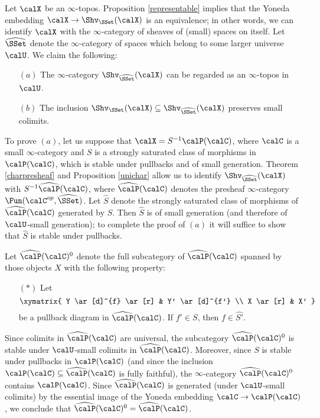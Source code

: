 \begin{remark}\label{quest}
Let $\calX$ be an $\infty$-topos. Proposition \ref{representable} implies that the Yoneda
embedding $\calX \rightarrow \Shv_{\SSet}(\calX)$ is an equivalence; in other words, we can identify $\calX$ with the $\infty$-category of sheaves of (small) spaces on itself. Let $\widehat{\SSet}$ denote the $\infty$-category of spaces which belong to some larger universe $\calU$. We claim the following:
\begin{itemize}
\item[$(a)$] The $\infty$-category $\Shv_{ \widehat{\SSet} }( \calX)$ can be regarded
as an $\infty$-topos in $\calU$.
\item[$(b)$] The inclusion $\Shv_{\SSet}(\calX) \subseteq \Shv_{\widehat{\SSet}}(\calX)$ preserves small colimits.
\end{itemize}
To prove $(a)$, let us suppose that $\calX = S^{-1} \calP(\calC)$, where
$\calC$ is a small $\infty$-category and $S$ is a strongly saturated class of morphisms
in $\calP(\calC)$, which is stable under pullbacks and of small generation.
Theorem \ref{charpresheaf} and Proposition \ref{unichar} allow us to identify
$\Shv_{\widehat{\SSet}}(\calX)$ with $S^{-1} \widehat{\calP}(\calC)$, where
$\widehat{\calP}(\calC)$ denotes the presheaf $\infty$-category
$\Fun( \calC^{op}, \widehat{\SSet})$. Let $\widehat{S}$ denote the strongly saturated class of morphisms of $\widehat{\calP}(\calC)$ generated by $S$. Then $\widehat{S}$ is of small generation (and therefore of $\calU$-small generation); to complete the proof of $(a)$ it will suffice to show that $\widehat{S}$ is stable under pullbacks. 

Let $\widehat{\calP}(\calC)^{0}$ denote the full subcategory of $\widehat{\calP}(\calC)$ spanned by those objects $X$ with the following property: 
\begin{itemize}
\item[$(\ast)$] Let
$$ \xymatrix{ Y \ar[d]^{f} \ar[r] & Y' \ar[d]^{f'} \\
X \ar[r] & X' }$$
be a pullback diagram in $\widehat{\calP}(\calC)$. If $f' \in S$, then $f \in \widehat{S'}$.
\end{itemize}
Since colimits in $\widehat{\calP}(\calC)$ are universal, the subcategory
$\widehat{\calP}(\calC)^{0}$ is stable under $\calU$-small colimits in
$\widehat{\calP}(\calC)$. Moreover, since $S$ is stable under pullbacks
in $\calP(\calC)$ (and since the inclusion $\calP(\calC) \subseteq \widehat{\calP}(\calC)$ is fully faithful), the $\infty$-category $\widehat{\calP}(\calC)^{0}$ contains $\calP(\calC)$.
Since $\widehat{\calP}(\calC)$ is generated (under $\calU$-small colimits) by the essential image of the Yoneda embedding $\calC \rightarrow \calP(\calC)$, we conclude that
$\widehat{\calP}(\calC)^{0} = \widehat{\calP}(\calC)$. 


\end{remark}
